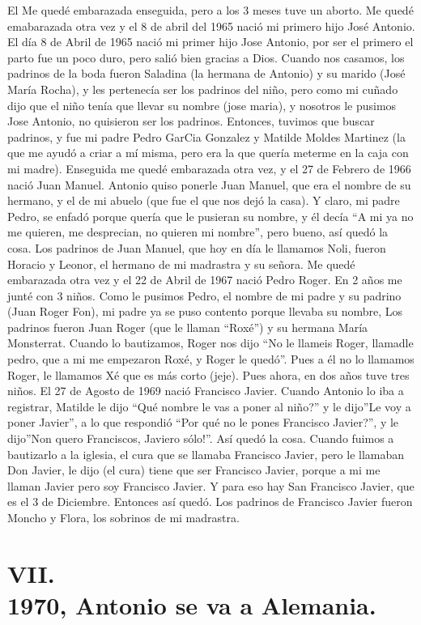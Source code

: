 \documentclass[12pt,a5paper]{book}
\begin{document}
El Me quedé embarazada enseguida, pero a los 3 meses tuve un aborto. Me quedé emabarazada otra vez y el 8 de abril del 1965 nació mi primero hijo José Antonio.
El día 8 de Abril de 1965 nació mi primer hijo Jose Antonio, por ser el primero el parto fue un poco duro, pero salió bien gracias a Dios. Cuando nos casamos, los padrinos de la boda fueron Saladina (la hermana de Antonio) y su marido (José María Rocha), y les pertenecía ser los padrinos del niño, pero como mi cuñado dijo que el niño tenía que llevar su nombre (jose maria), y nosotros le pusimos Jose Antonio, no quisieron ser los padrinos. Entonces, tuvimos que buscar padrinos, y fue mi padre Pedro GarCia Gonzalez y Matilde Moldes Martinez (la que me ayudó a criar a mí misma, pero era la que quería meterme en la caja con mi madre). 
Enseguida me quedé embarazada otra vez, y el 27 de Febrero de 1966 nació Juan Manuel. Antonio quiso ponerle Juan Manuel, que era el nombre de su hermano, y el de mi abuelo (que fue el que nos dejó la casa). Y claro, mi padre Pedro, se enfadó porque quería que le pusieran su nombre, y él decía “A mi ya no me quieren, me desprecian, no quieren mi nombre”, pero bueno, así quedó la cosa. Los padrinos de Juan Manuel, que hoy en día le llamamos Noli, fueron Horacio y Leonor, el hermano de mi madrastra y su señora.
Me quedé embarazada otra vez y el 22 de Abril de 1967 nació Pedro Roger. En 2 años me junté con 3 niños. Como le pusimos Pedro, el nombre de mi padre y su padrino (Juan Roger Fon), mi padre ya se puso contento porque llevaba su nombre, Los padrinos fueron Juan Roger (que le llaman “Roxé”) y su hermana María Monsterrat. Cuando lo bautizamos, Roger nos dijo “No le llameis Roger, llamadle pedro, que a mi me empezaron Roxé, y Roger le quedó”. Pues a él no lo llamamos Roger, le llamamos Xé que es más corto (jeje).  Pues ahora, en dos años tuve tres niños.
 El 27 de Agosto de 1969 nació Francisco Javier.  Cuando Antonio lo iba a registrar, Matilde le dijo “Qué nombre le vas a poner al niño?” y le dijo”Le voy a poner Javier”, a lo que respondió “Por qué no le pones Francisco Javier?”, y le dijo”Non quero Franciscos, Javiero sólo!”. Así quedó la cosa. Cuando fuimos a bautizarlo a la iglesia, el cura que se llamaba Francisco Javier, pero le llamaban Don Javier, le dijo (el cura) tiene que ser Francisco Javier, porque a mi me llaman Javier pero soy Francisco Javier. Y para eso hay San Francisco Javier, que es el 3 de Diciembre. Entonces así quedó. Los padrinos de Francisco Javier fueron Moncho y Flora, los sobrinos de mi madrastra.


\section*{VII.\\1970, Antonio se va a Alemania.}
\end{document}
